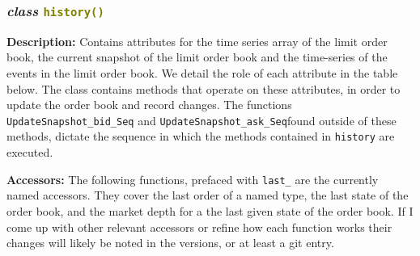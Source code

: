 
\subsubsection{\textit{class} \textcolor{olive}{\texttt{history()}}}
\textbf{Description:} Contains attributes for the time series array of the limit order book, the current snapshot of the limit order book and the time-series of the events in the limit order book. We detail the role of each attribute in the table below. The class contains methods that operate on these attributes, in order to update the order book and record changes. The functions \texttt{UpdateSnapshot\_bid\_Seq} and \texttt{UpdateSnapshot\_ask\_Seq}found outside of these methods, dictate the sequence in which the methods contained in \texttt{history} are executed.

\begin{center}
	
\end{center}


\cleardoublepage


\cleardoublepage


\cleardoublepage


\cleardoublepage


\cleardoublepage


\cleardoublepage


\cleardoublepage


\cleardoublepage


\cleardoublepage


\cleardoublepage


\cleardoublepage


\cleardoublepage


\cleardoublepage


\cleardoublepage


\noindent\textbf{Accessors:} The following functions, prefaced with \texttt{last\_} are the currently named accessors. They cover the last order of a named type, the last state of the order book, and the market depth for a the last given state of the order book. If I come up with other relevant accessors or refine how each function works their changes will likely be noted in the versions, or at least a git entry. 


\cleardoublepage
